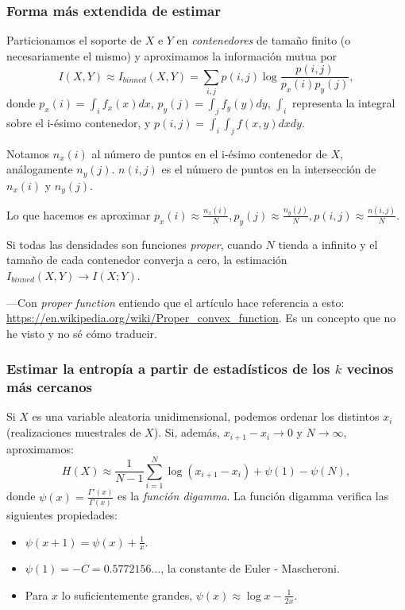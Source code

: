 \documentclass[10pt,a4paper]{article} %
\theoremstyle{definition}
\begin{document}
\subsubsection{Forma más extendida de estimar}

Particionamos el soporte de $X$ e $Y$ en \textit{contenedores} de tamaño finito (o necesariamente el mismo) y aproximamos la información mutua por \[
I(X,Y) \approx I_{\textit{binned}}(X,Y) = \sum_{i,j} p(i,j) \log \frac{p(i,j)}{p_x(i)p_y(j)},
\]
donde $p_x(i) = \int_i f_x(x)dx$, $p_y(j) = \int_j f_y(y)dy$, $\int_i$ representa la integral sobre el i-ésimo contenedor, y $p(i,j) = \int_i\int_jf(x,y)dxdy$.

Notamos $n_x(i)$ al número de puntos en el i-ésimo contenedor de $X$, análogamente $n_y(j)$. $n(i,j)$ es el número de puntos en la intersección de $n_x(i)$ y $n_y(j)$.

Lo que hacemos es aproximar $p_x(i) \approx \frac{n_x(i)}{N}, p_y(j) \approx \frac{n_y(j)}{N}, p(i,j) \approx \frac{n(i,j)}{N}$.

Si todas las densidades son funciones \textit{proper}, cuando $N$ tienda a infinito y el tamaño de cada contenedor converja a cero, la estimación $I_{\textit{binned}}(X,Y) \to I(X;Y)$.

---Con \textit{proper function} entiendo que el artículo hace referencia a esto: \url{https://en.wikipedia.org/wiki/Proper\_convex\_function}. Es un concepto que no he visto y no sé cómo traducir.

\subsubsection{Estimar la entropía a partir de estadísticos de los $k$ vecinos más cercanos}

Si $X$ es una variable aleatoria unidimensional, podemos ordenar los distintos $x_i$ (realizaciones muestrales de $X$). Si, además, $x_{i+1} -x_i \to 0$ y $N\to \infty$, aproximamos:\[
H(X)\approx \frac{1}{N-1}\sum_{i=1}^N \log(x_{i+1}-x_i) + \psi(1) - \psi(N),\]
donde $\psi(x) = \frac{\Gamma'(x)}{\Gamma(x)}$ es la \textit{función digamma}. La función digamma verifica las siguientes propiedades:
\begin{itemize}
\item $\psi(x+1) = \psi(x) + \frac{1}{x}$.
\item $\psi(1) = -C = 0.5772156\dots$, la constante de Euler - Mascheroni.
  \item Para $x$ lo suficientemente grandes, $\psi(x) \approx \log x - \frac{1}{2x}$.
\end{itemize}
\end{document}
